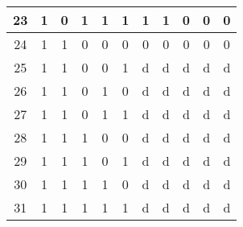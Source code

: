 \documentclass{article}
\begin{document}
\begin{center}
\begin{tabular}{|c|ccccc|ccccc|}
    23 & 1 & 0 & 1 & 1 & 1 & 1 & 1 & 0 & 0 & 0 \\ \hline
    24 & 1 & 1 & 0 & 0 & 0 & 0 & 0 & 0 & 0 & 0 \\ \hline
    25 & 1 & 1 & 0 & 0 & 1 & d & d & d & d & d \\ \hline
    26 & 1 & 1 & 0 & 1 & 0 & d & d & d & d & d \\ \hline
    27 & 1 & 1 & 0 & 1 & 1 & d & d & d & d & d \\ \hline
    28 & 1 & 1 & 1 & 0 & 0 & d & d & d & d & d \\ \hline
    29 & 1 & 1 & 1 & 0 & 1 & d & d & d & d & d \\ \hline
    30 & 1 & 1 & 1 & 1 & 0 & d & d & d & d & d \\ \hline
    31 & 1 & 1 & 1 & 1 & 1 & d & d & d & d & d \\ \hline
\end{tabular}\end{center}
\end{document}
